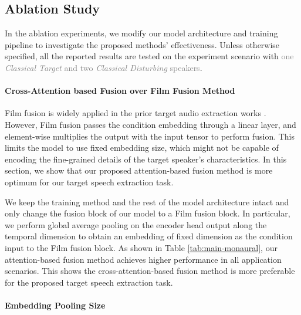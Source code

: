 \subsection{Ablation Study} \label{sec:ablation}

In the ablation experiments, we modify our model architecture and training pipeline to investigate the proposed methods' effectiveness. Unless otherwise specified, all the reported results are tested on the experiment scenario with \textcolor{gray}{one \textit{Classical Target} and two \textit{Classical Disturbing} speakers}. 

\paragraph{Cross-Attention based Fusion over Film Fusion Method}

Film fusion is widely applied in the prior target audio extraction works \cite{film-fusion}. However, Film fusion passes the condition embedding through a linear layer, and element-wise multiplies the output with the input tensor to perform fusion. This limits the model to use fixed embedding size, which might not be capable of encoding the fine-grained details of the target speaker's characteristics. In this section, we show that our proposed attention-based fusion method is more optimum for our target speech extraction task.

We keep the training method and the rest of the model architecture intact and only change the fusion block of our model to a Film fusion block. In particular, we perform global average pooling on the encoder head output along the temporal dimension to obtain an embedding of fixed dimension as the condition input to the Film fusion block. As shown in Table \ref{tab:main-monaural}, our attention-based fusion method achieves higher performance in all application scenarios. This shows the cross-attention-based fusion method is more preferable for the proposed target speech extraction task.

\paragraph{Embedding Pooling Size}


